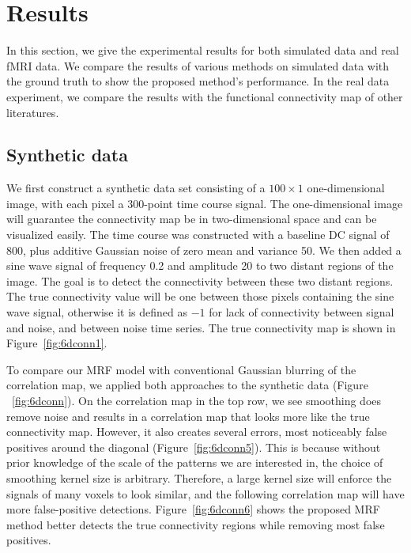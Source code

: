 \section{Results}
\label{sec:results}
In this section, we give the experimental results for both  simulated data and
real fMRI data. We compare the results of various methods on simulated data
with the ground truth to show the proposed method's performance. In the real
data experiment, we compare the results with the functional connectivity map of
other literatures.


\subsection{Synthetic data} 
\label{sec:m1syn}
We first construct a synthetic data set consisting of a $100\times 1$
one-dimensional image, with each pixel a 300-point time course signal. The
one-dimensional image will guarantee the connectivity map be in
two-dimensional space and can be visualized easily. The time course was
constructed with a baseline DC signal of 800, plus additive Gaussian noise of
zero mean and variance 50. We then added a sine wave signal of frequency 0.2
and amplitude 20 to two distant regions of the image. The goal is to detect
the connectivity between these two distant regions. The true connectivity
value will be one between those pixels containing the sine wave signal,
otherwise it is defined as $-1$ for lack of connectivity between signal and
noise, and between noise time series. The true connectivity map is shown in
Figure~\ref{fig:6dconn1}.

To compare our MRF model with conventional Gaussian blurring of the correlation
map, we applied both approaches to the synthetic data (Figure
~\ref{fig:6dconn}). On the correlation map in the top row, we see smoothing does
remove noise and results in a correlation map that looks more like the true
connectivity map. However, it also creates several errors, most noticeably false
positives around the diagonal (Figure~\ref{fig:6dconn5}). This is because
without prior knowledge of the scale of the patterns we are interested in, the
choice of smoothing kernel size is arbitrary. Therefore, a large kernel size
will enforce the signals of many voxels to look similar, and the following correlation
map will have more false-positive detections. Figure~\ref{fig:6dconn6} shows the
proposed MRF method better detects the true connectivity regions while removing
most false positives.
 

